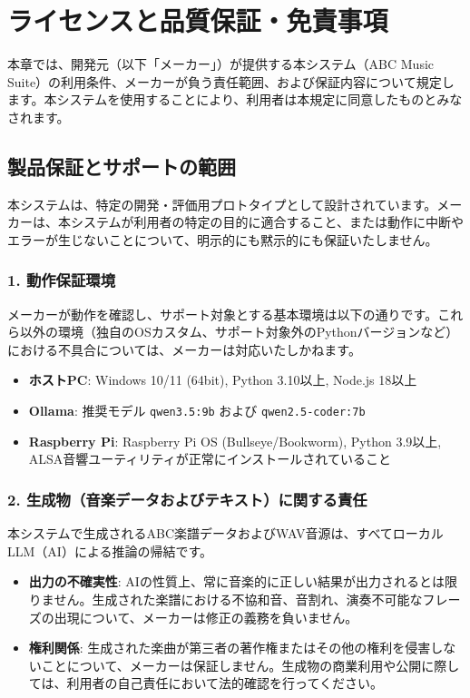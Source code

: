 \section{ライセンスと品質保証・免責事項}

本章では、開発元（以下「メーカー」）が提供する本システム（ABC Music Suite）の利用条件、メーカーが負う責任範囲、および保証内容について規定します。本システムを使用することにより、利用者は本規定に同意したものとみなされます。

\subsection{製品保証とサポートの範囲}

本システムは、特定の開発・評価用プロトタイプとして設計されています。メーカーは、本システムが利用者の特定の目的に適合すること、または動作に中断やエラーが生じないことについて、明示的にも黙示的にも保証いたしません。

\subsubsection{1. 動作保証環境}
メーカーが動作を確認し、サポート対象とする基本環境は以下の通りです。これら以外の環境（独自のOSカスタム、サポート対象外のPythonバージョンなど）における不具合については、メーカーは対応いたしかねます。
\begin{itemize}
  \item \textbf{ホストPC}: Windows 10/11 (64bit), Python 3.10以上, Node.js 18以上
  \item \textbf{Ollama}: 推奨モデル \texttt{qwen3.5:9b} および \texttt{qwen2.5-coder:7b}
  \item \textbf{Raspberry Pi}: Raspberry Pi OS (Bullseye/Bookworm), Python 3.9以上, ALSA音響ユーティリティが正常にインストールされていること
\end{itemize}

\subsubsection{2. 生成物（音楽データおよびテキスト）に関する責任}
本システムで生成されるABC楽譜データおよびWAV音源は、すべてローカルLLM（AI）による推論の帰結です。
\begin{itemize}
  \item \textbf{出力の不確実性}: AIの性質上、常に音楽的に正しい結果が出力されるとは限りません。生成された楽譜における不協和音、音割れ、演奏不可能なフレーズの出現について、メーカーは修正の義務を負いません。
  \item \textbf{権利関係}: 生成された楽曲が第三者の著作権またはその他の権利を侵害しないことについて、メーカーは保証しません。生成物の商業利用や公開に際しては、利用者の自己責任において法的確認を行ってください。
\end{itemize}


